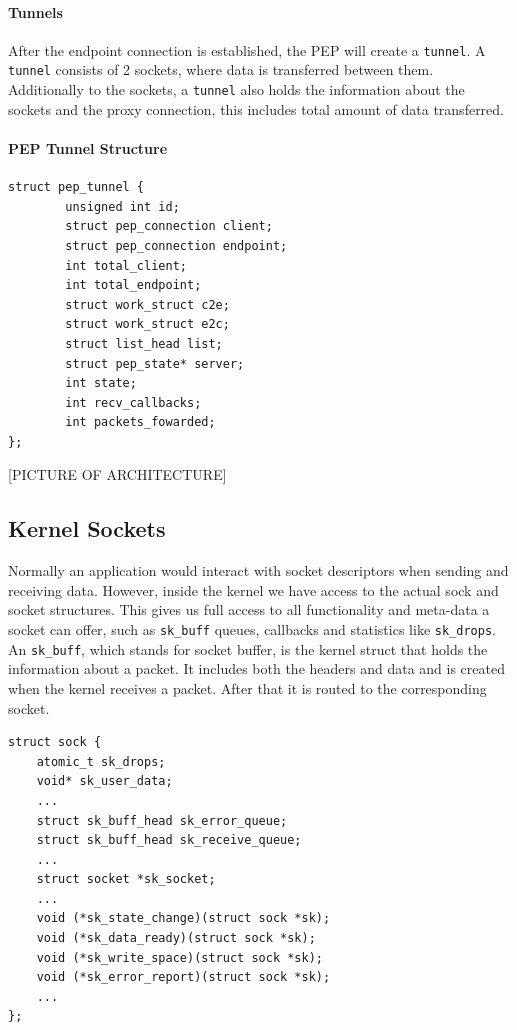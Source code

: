 \documentclass[a4paper,english, 11pt]{report}
\begin{document}
\paragraph{Tunnels}
After the endpoint connection is established, the PEP will create a \verb|tunnel|. A \verb|tunnel| consists of 2 sockets, where data is transferred between them. Additionally to the sockets, a \verb|tunnel| also holds the information about the sockets and the proxy connection, this includes total amount of data transferred.\\

\noindent\begin{minipage}{\linewidth}
\paragraph{PEP Tunnel Structure}
\begin{verbatim}
struct pep_tunnel {
        unsigned int id;
        struct pep_connection client;
        struct pep_connection endpoint;
        int total_client;
        int total_endpoint;
        struct work_struct c2e;
        struct work_struct e2c;
        struct list_head list;
        struct pep_state* server;
        int state;
        int recv_callbacks;
        int packets_fowarded;
};
\end{verbatim}
\end{minipage}

[PICTURE OF ARCHITECTURE]\\

\subsection{Kernel Sockets}
Normally an application would interact with socket descriptors when sending and receiving data. However, inside the kernel we have access to the actual sock and socket structures. This gives us full access to all functionality and meta-data a socket can offer, such as \verb|sk_buff| queues, callbacks and statistics like \verb|sk_drops|. An \verb|sk_buff|, which stands for socket buffer, is the kernel struct that holds the information about a packet. It includes both the headers and data and is created when the kernel receives a packet. After that it is routed to the corresponding socket.\\

\noindent\begin{minipage}{\linewidth}
\begin{verbatim}
struct sock {
    atomic_t sk_drops;
    void* sk_user_data;
    ...
    struct sk_buff_head	sk_error_queue;
    struct sk_buff_head	sk_receive_queue;
    ...
    struct socket *sk_socket;
    ...
    void (*sk_state_change)(struct sock *sk);
    void (*sk_data_ready)(struct sock *sk);
    void (*sk_write_space)(struct sock *sk);
    void (*sk_error_report)(struct sock *sk);
    ...
};
\end{verbatim}
\label{fig:kern_sock}
\end{minipage}
\end{document}
